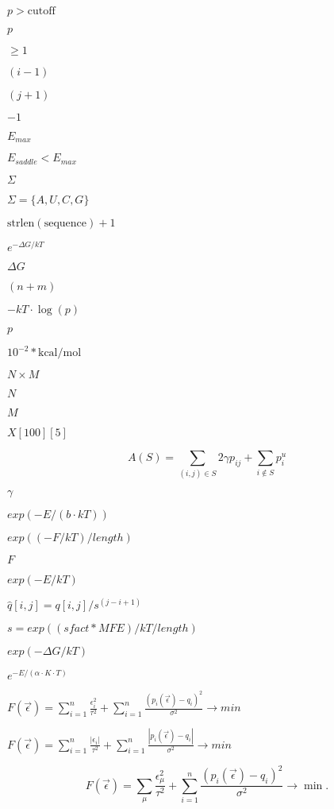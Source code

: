 \documentclass{article}
\begin{document}
$ p > \textrm{cutoff} $
\pagebreak

$ p $
\pagebreak

$ \ge 1 $
\pagebreak

$(i - 1)$
\pagebreak

$(j+1)$
\pagebreak

$-1$
\pagebreak

$E_{max}$
\pagebreak

$E_{saddle} < E_{max}$
\pagebreak

$\Sigma$
\pagebreak

$ \Sigma = \{A,U,C,G\} $
\pagebreak

$\mathrm{strlen}(\mathrm{sequence})+1$
\pagebreak

$e^{-\Delta G/kT} $
\pagebreak

$\Delta G$
\pagebreak

$(n+m)$
\pagebreak

$-kT \cdot \log(p)$
\pagebreak

$p$
\pagebreak

$10^{-2} * \mathrm{kcal}/\mathrm{mol}$
\pagebreak

$ N \times M $
\pagebreak

$N$
\pagebreak

$M$
\pagebreak

$X[100][5]$
\pagebreak

\[ A(S) = \sum_{(i,j) \in S} 2 \gamma p_{ij} + \sum_{i \notin S} p^u_i \]
\pagebreak

$\gamma$
\pagebreak

$ exp(-E / (b \cdot kT))$
\pagebreak

$exp{((-F/kT)/length)}$
\pagebreak

$F$
\pagebreak

$ exp(-E / kT) $
\pagebreak

$\hat{q}[i,j] = q[i,j] / s^{(j-i+1)}$
\pagebreak

$ s = exp((sfact * MFE) / kT / length )$
\pagebreak

$ exp(-\Delta G / kT) $
\pagebreak

$ e^{-E/(\alpha \cdot K \cdot T)} $
\pagebreak

$ F(\vec\epsilon) = \sum_{i = 1}^n{ \frac{\epsilon_i^2}{\tau^2} } + \sum_{i = 1}^n{ \frac{(p_i(\vec\epsilon) - q_i)^2}{\sigma^2} } \to min $
\pagebreak

$ F(\vec\epsilon) = \sum_{i = 1}^n{ \frac{|\epsilon_i|}{\tau^2} } + \sum_{i = 1}^n{ \frac{|p_i(\vec\epsilon) - q_i|}{\sigma^2} } \to min $
\pagebreak

\[ F(\vec\epsilon) = \sum_{\mu}{ \frac{\epsilon_{\mu}^2}{\tau^2} } + \sum_{i = 1}^n{ \frac{(p_i(\vec\epsilon) - q_i)^2}{\sigma^2} } \to \min. \]
\pagebreak
\end{document}
